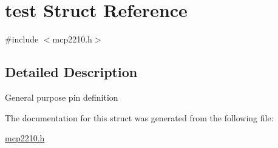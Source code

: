 \hypertarget{structtest}{\section{test \-Struct \-Reference}
\label{structtest}
}


{\ttfamily \#include $<$mcp2210.\-h$>$}



\subsection{\-Detailed \-Description}
\-General purpose pin definition 

\-The documentation for this struct was generated from the following file\-:\begin{DoxyCompactItemize}
\item 
\hyperlink{mcp2210_8h}{mcp2210.\-h}\end{DoxyCompactItemize}

